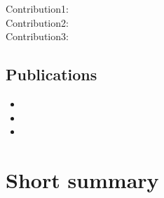 \begin{description}

\item[Contribution1:] \lipsum[1]

\item[Contribution2:] \lipsum[1]

\item[Contribution3:] \lipsum[1]


\end{description}

\subsection{Publications}

\begin{itemize}
\item {}
\item {}
\item {}
\end{itemize}



\section{Short summary}

\lipsum[1-5]
